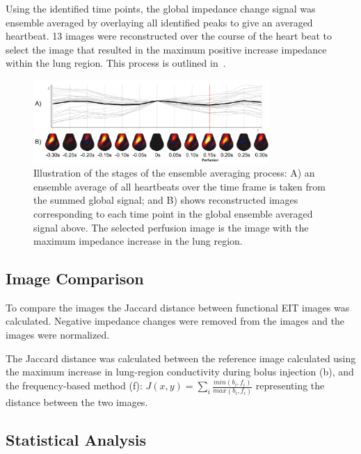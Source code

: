 Using the identified time points, the global impedance change signal 
was ensemble averaged by overlaying all identified peaks 
to give an averaged heartbeat. 13 images were reconstructed over the 
course of the heart beat to select the image that resulted in the maximum 
positive increase impedance within the lung region. This process is outlined 
in~.

\begin{figure}
\begin{flushright}
\includegraphics[width=0.8\textwidth]{chapter_2/imgs/fig-methodsTime.pdf}
\end{flushright}
\caption[Ensemble averaging analysis]{\label{fig:timeAnalysis}%
Illustration of the stages of the ensemble averaging process:
A) an ensemble average of all heartbeats over the time frame is taken from the 
summed global signal; and 
B) shows reconstructed images corresponding to each time point 
in the global ensemble averaged signal above.
The selected perfusion image is the image with the maximum impedance increase in the 
lung region.
}

\end{figure}

\subsection{Image Comparison}

To compare the images the Jaccard 
distance between functional EIT images was calculated. 
Negative impedance changes were removed from the images
and the images were normalized.

The Jaccard distance was calculated between the reference image 
calculated using the maximum increase in lung-region conductivity during 
bolus injection (b), and the frequency-based method (f):
$J(x,y) = \sum_{i}\frac{min(b_i,f_i)}{max(b_i,f_i)}$
representing the distance between the two images.

\subsection{Statistical Analysis}

